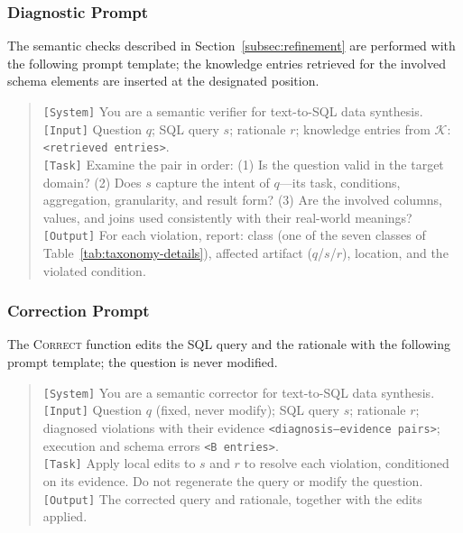 \documentclass[letterpaper,journal]{IEEEtran}
\begin{document}
\subsubsection{Diagnostic Prompt}
\label{app:taxonomy:diagnose}

The semantic checks described in Section~\ref{subsec:refinement} are performed with the following prompt template; the knowledge entries retrieved for the involved schema elements are inserted at the designated position.

\begin{quote}
\small
\texttt{[System]} You are a semantic verifier for text-to-SQL data synthesis. \\
\texttt{[Input]} Question $q$; SQL query $s$; rationale $r$; knowledge entries from $\mathcal{K}$: \texttt{<retrieved entries>}. \\
\texttt{[Task]} Examine the pair in order: (1) Is the question valid in the target domain? (2) Does $s$ capture the intent of $q$---its task, conditions, aggregation, granularity, and result form? (3) Are the involved columns, values, and joins used consistently with their real-world meanings? \\
\texttt{[Output]} For each violation, report: class (one of the seven classes of Table~\ref{tab:taxonomy-details}), affected artifact ($q$/$s$/$r$), location, and the violated condition.
\end{quote}

\subsubsection{Correction Prompt}
\label{app:taxonomy:correct}

The \textsc{Correct} function edits the SQL query and the rationale with the following prompt template; the question is never modified.

\begin{quote}
\small
\texttt{[System]} You are a semantic corrector for text-to-SQL data synthesis. \\
\texttt{[Input]} Question $q$ (fixed, never modify); SQL query $s$; rationale $r$; diagnosed violations with their evidence \texttt{<diagnosis--evidence pairs>}; execution and schema errors \texttt{<B entries>}. \\
\texttt{[Task]} Apply local edits to $s$ and $r$ to resolve each violation, conditioned on its evidence. Do not regenerate the query or modify the question. \\
\texttt{[Output]} The corrected query and rationale, together with the edits applied.
\end{quote}
\end{document}
